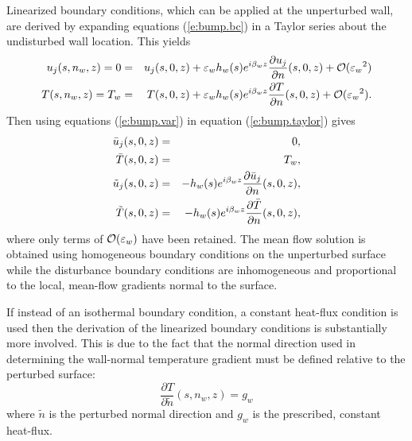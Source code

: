 Linearized boundary conditions, which can be applied at the unperturbed wall,
are derived by expanding equations (\ref{e:bump.bc}) in a Taylor series about
the undisturbed wall location.  This yields
%
\begin{eqnarray} \label{e:bump.taylor}
  u_j(s,n_w,z) = 0 &=& u_j(s,0,z) + {\varepsilon_w} h_w(s) e^{i {\beta_{w}} z} 
                   \frac{\partial u_j}{\partial n}(s,0,z) + {\cal O}({\varepsilon_w}^2) \\
    T(s,n_w,z) = T_w &=& T(s,0,z) + {\varepsilon_w} h_w(s) e^{i {\beta_{w}} z} 
                  \frac{\partial T}{\partial n}(s,0,z) + {\cal O}({\varepsilon_w}^2) .
\end{eqnarray}
%
Then using equations (\ref{e:bump.var}) in equation (\ref{e:bump.taylor}) gives
%
\begin{eqnarray}
  \bar u_j(s,0,z)   &=& 0, \\
  \bar T(s,0,z)     &=& T_w, \\
  \tilde u_j(s,0,z) &=& -h_w(s) e^{i {\beta_{w}} z} 
                        \frac{\partial \bar u_j}{\partial n}(s,0,z), \\
  \tilde T(s,0,z)   &=& -h_w(s) e^{i {\beta_{w}} z} 
                        \frac{\partial \bar T}{\partial n}(s,0,z), 
\end{eqnarray}
%
where only terms of ${\cal O}({\varepsilon_w})$ have been retained.  The mean flow solution is
obtained using homogeneous boundary conditions on the unperturbed surface
while the disturbance boundary conditions are inhomogeneous and proportional
to the local, mean-flow gradients normal to the surface.

If instead of an isothermal boundary condition, a constant heat-flux condition
is used then the derivation of the linearized boundary conditions is
substantially more involved.  This is due to the fact that the normal
direction used in determining the wall-normal temperature gradient must be
defined relative to the perturbed surface:
%
\begin{equation}
 \frac{\partial T}{\partial \tilde n}(s,n_w,z) = g_w
\end{equation}
%
where $\tilde n$ is the perturbed normal direction and $g_w$ is the prescribed,
constant heat-flux.  

